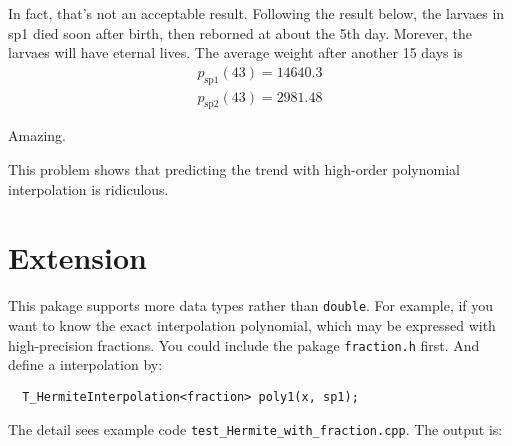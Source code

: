 \documentclass[11pt,en]{elegantpaper}
\begin{document}
\begin{center}
\end{center}

In fact, that's not an acceptable result. Following the result below, the larvaes in sp1 died soon after birth, then reborned at about the 5th day. Morever, the larvaes will have eternal lives. The average weight after another 15 days is
\begin{align*}
  p_\text{sp1}(43) = 14640.3\\
  p_\text{sp2}(43) = 2981.48
\end{align*}

Amazing.

This problem shows that predicting the trend with high-order polynomial interpolation is ridiculous.

\section{Extension}

This pakage supports more data types rather than \verb|double|. For example, if you want to know the exact interpolation polynomial, which may be expressed with high-precision fractions. You could include the pakage \verb|fraction.h| first. And define a interpolation by:

\begin{lstlisting}
  T_HermiteInterpolation<fraction> poly1(x, sp1);
\end{lstlisting}

The detail sees example code \verb|test_Hermite_with_fraction.cpp|. The output is:
\end{document}
